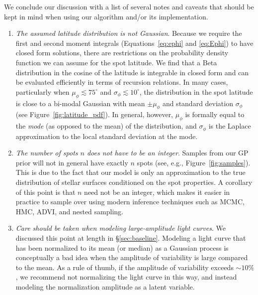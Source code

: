 \documentclass[modern]{aastex62}
\begin{document}
We conclude our discussion with a list of several notes and caveats that should be kept
in mind when using our algorithm and/or its \Python implementation.

\begin{enumerate}
    \item \emph{The assumed latitude distribution is not Gaussian}.
          Because we require the first and second moment integrals
          (Equations~\ref{eq:ephi} and \ref{eq:Ephi}) to have closed
          form solutions, there are restrictions on the probability
          density function we can assume for the spot latitude.
          We find that a Beta distribution in the cosine of the latitude
          is integrable in closed form and can be evaluated efficiently
          in terms of recursion relations. In many cases, particularly
          when $\mu_\phi \lesssim 75^\circ$ and $\sigma_\phi \lesssim 10^\circ$,
          the distribution in the spot latitude
          is close to a bi-modal Gaussian with mean $\pm\mu_\phi$ and
          standard deviation $\sigma_\phi$ (see Figure~\ref{fig:latitude_pdf}).
          In general, however, $\mu_\phi$ is formally equal to the \emph{mode}
          (as opposed to the mean) of the distribution, and $\sigma_\phi$ is
          the Laplace approximation to the local standard deviation at the mode.
    \item \emph{The number of spots $n$ does not have to be an integer}.
          Samples from our GP prior will not in general have exactly $n$
          spots (see, e.g., Figure~\ref{fig:samples}). This is due to the fact
          that our model is only an approximation to the true distribution
          of stellar surfaces conditioned on the spot properties. A corollary
          of this point is that $n$ need not be an integer, which makes it
          easier in practice to sample over using modern inference
          techniques such as MCMC, HMC, ADVI, and nested sampling.
    \item \emph{Care should be taken when modeling large-amplitude light curves}.
          We discussed this point at length in \S\ref{sec:baseline}. Modeling
          a light curve that has been normalized to its mean (or median) as a
          Gaussian process is conceptually a bad idea when the amplitude
          of variability is large compared to the mean. As a rule of thumb, if
          the amplitude of variability exceeds $\sim 10\%$, we recommend
          not normalizing the light curve in this way, and instead modeling
          the normalization amplitude as a latent variable.

\end{enumerate}
\end{document}
